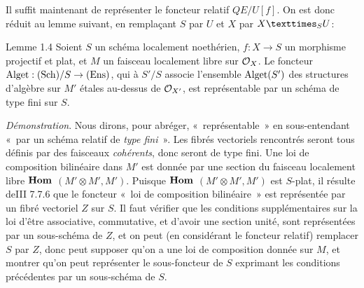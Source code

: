 \documentclass[10pt]{../fichiers-configuration-latex/smfart}
\begin{document}
Il suffit maintenant de représenter le foncteur relatif $QE/U[f]$. On
est donc réduit au lemme suivant, en remplaçant $S$ par $U$ et $X$
par $\fprod{X}{U}{S}$:

\begin{enonce*}{Lemme 1.4}
Soient $S$ un schéma localement noethérien, $f:X\rightarrow S$ un
morphisme projectif et plat, et $M$ un faisceau localement libre sur
${\mathcal O}_X$. Le foncteur $\operatorname{Alget}:(\operatorname{Sch})/S\rightarrow (\operatorname{Ens})$, qui à
$S'/S$ associe l'ensemble $\operatorname{Alget}(S')$ des structures d'algèbre sur
$M'$ étales au-dessus de ${\mathcal O}_{X'}$, est représentable par un schéma
de type fini sur $S$.
\end{enonce*}

\noindent
\emph{Démonstration}. Nous dirons, pour abréger,
« représentable » en sous-entendant « par un schéma relatif
de \emph{type fini} ». Les fibrés vectoriels rencontrés seront tous définis par des
faisceaux \emph{cohérents}, donc seront de type fini. Une loi de
composition bilinéaire dans $M'$ est donnée par une section du
faisceau localement libre $\operatorname{\mathbf{Hom}}$ $(M'\otimes M', M')$. Puisque
$\operatorname{\mathbf{Hom}}$ $(M'\otimes M', M')$ est $S$-plat, il résulte
de\pageoriginale \EGA III 7.7.6 que le foncteur « loi de composition
bilinéaire » est représentée par un fibré vectoriel $Z$ sur $S$. Il
faut vérifier que les conditions supplémentaires sur la loi d'être
associative, commutative, et d'avoir une section unité, sont
représentées par un sous-schéma de $Z$, et on peut (en considérant le
foncteur relatif) remplacer $S$ par $Z$, donc peut supposer qu'on a
une loi de composition donnée sur $M$, et montrer qu'on peut
représenter le sous-foncteur de $S$ exprimant les conditions
précédentes par un sous-schéma de $S$.
\end{document}
